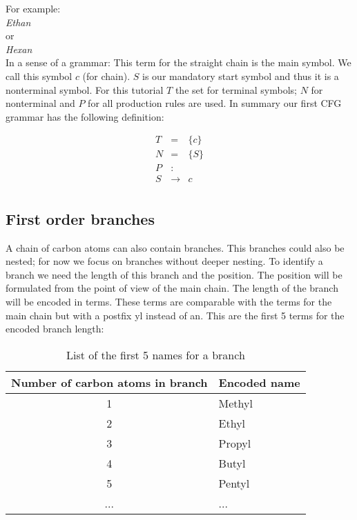 \documentclass[a4paper,10pt]{article}
\newcommand{\gerquot}[1]{\glqq#1\grqq}
\newcommand{\captionVSpace}{\vspace*{-0.05cm}}
\begin{document}
\noindent For example: \\
\emph{Ethan}\qquad {} \\
or \\
\emph{Hexan}\qquad {} \\

In a sense of a grammar: This term for the straight chain is the main symbol. We call this symbol $c$ (for chain). $S$ is our mandatory start symbol and thus it is a nonterminal symbol. For this tutorial $T$ the set for terminal symbols; $N$ for nonterminal and $P$ for all production rules are used. In summary our first CFG grammar has the following definition:

$$
\begin{aligned}
    T &=& \{c\} \\
    N &=& \{S\} \\
    P &:& \\
    S &\rightarrow& c \\
\end{aligned}
$$

\subsection{First order branches}
A chain of carbon atoms can also contain branches. This branches could also be nested; for now we focus on branches without deeper nesting. To identify a branch we need the length of this branch and the position. The position will be formulated from the point of view of the main chain. The length of the branch will be encoded in terms. These terms are comparable with the terms for the main chain but with a postfix \gerquot{yl} instead of \gerquot{an}. This are the first 5 terms for the encoded branch length:

\begin{table}[H]
    \centering
    \begin{tabular}{c|l}
        \toprule
        \textbf{Number of carbon atoms in branch} & \textbf{Encoded name} \\
        \midrule
        1 & Methyl \\
        2 & Ethyl \\
        3 & Propyl \\
        4 & Butyl \\
        5 & Pentyl \\
        ... & ... \\
        \bottomrule
    \end{tabular}
    \captionVSpace
    \caption{List of the first 5 names for a branch}
    \label{tab:NumCarbonBranchEncodedName}
\end{table}
\end{document}
